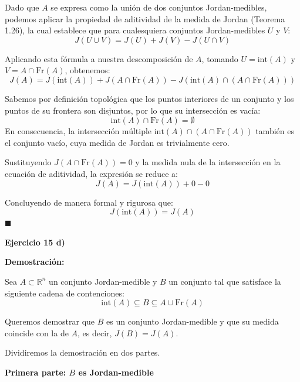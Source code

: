 \documentclass[11pt,letterpaper]{article}
\begin{document}
Dado que $A$ se expresa como la unión de dos conjuntos Jordan-medibles, podemos aplicar la propiedad de aditividad de la medida de Jordan (Teorema 1.26), la cual establece que para cualesquiera conjuntos Jordan-medibles $U$ y $V$:
\begin{equation*}
J(U \cup V) = J(U) + J(V) - J(U \cap V)
\end{equation*}

Aplicando esta fórmula a nuestra descomposición de $A$, tomando $U = \text{int}(A)$ y $V = A \cap \text{Fr}(A)$, obtenemos:
\begin{equation*}
J(A) = J(\text{int}(A)) + J(A \cap \text{Fr}(A)) - J(\text{int}(A) \cap (A \cap \text{Fr}(A)))
\end{equation*}

Sabemos por definición topológica que los puntos interiores de un conjunto y los puntos de su frontera son disjuntos, por lo que su intersección es vacía:
\begin{equation*}
\text{int}(A) \cap \text{Fr}(A) = \emptyset
\end{equation*}
En consecuencia, la intersección múltiple $\text{int}(A) \cap (A \cap \text{Fr}(A))$ también es el conjunto vacío, cuya medida de Jordan es trivialmente cero. 

Sustituyendo $J(A \cap \text{Fr}(A)) = 0$ y la medida nula de la intersección en la ecuación de aditividad, la expresión se reduce a:
\begin{equation*}
J(A) = J(\text{int}(A)) + 0 - 0
\end{equation*}

Concluyendo de manera formal y rigurosa que:
\begin{equation*}
J(\text{int}(A)) = J(A)
\end{equation*}
\hfill $\blacksquare$

\textbf{Ejercicio 15 d)}

\textbf{Demostración:}

Sea $A \subset \mathbb{R}^n$ un conjunto Jordan-medible y $B$ un conjunto tal que satisface la siguiente cadena de contenciones:
\begin{equation*}
\text{int}(A) \subseteq B \subseteq A \cup \text{Fr}(A)
\end{equation*}

Queremos demostrar que $B$ es un conjunto Jordan-medible y que su medida coincide con la de $A$, es decir, $J(B) = J(A)$.

Dividiremos la demostración en dos partes.

\vspace{0.5cm}
\textbf{Primera parte: $B$ es Jordan-medible}
\end{document}

